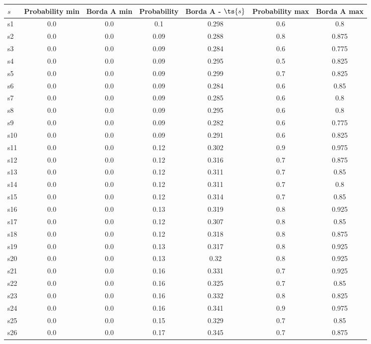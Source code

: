 \documentclass{article}
\begin{document}
\noindent\begin{tabular}{|l|c|c|c|c|c|c|}
\hline
$s$& Probability min & Borda A min & Probability & Borda A - $\ts{s}$ & Probability max & Borda A max\\
\hline
s1 &0.0 & 0.0 & 0.1 & 0.298 & 0.6 & 0.8\\
\hline
s2 &0.0 & 0.0 & 0.09 & 0.288 & 0.8 & 0.875\\
\hline
s3 &0.0 & 0.0 & 0.09 & 0.284 & 0.6 & 0.775\\
\hline
s4 &0.0 & 0.0 & 0.09 & 0.295 & 0.5 & 0.825\\
\hline
s5 &0.0 & 0.0 & 0.09 & 0.299 & 0.7 & 0.825\\
\hline
s6 &0.0 & 0.0 & 0.09 & 0.284 & 0.6 & 0.85\\
\hline
s7 &0.0 & 0.0 & 0.09 & 0.285 & 0.6 & 0.8\\
\hline
s8 &0.0 & 0.0 & 0.09 & 0.295 & 0.6 & 0.8\\
\hline
s9 &0.0 & 0.0 & 0.09 & 0.282 & 0.6 & 0.775\\
\hline
s10 &0.0 & 0.0 & 0.09 & 0.291 & 0.6 & 0.825\\
\hline
s11 &0.0 & 0.0 & 0.12 & 0.302 & 0.9 & 0.975\\
\hline
s12 &0.0 & 0.0 & 0.12 & 0.316 & 0.7 & 0.875\\
\hline
s13 &0.0 & 0.0 & 0.12 & 0.311 & 0.7 & 0.85\\
\hline
s14 &0.0 & 0.0 & 0.12 & 0.311 & 0.7 & 0.8\\
\hline
s15 &0.0 & 0.0 & 0.12 & 0.314 & 0.7 & 0.85\\
\hline
s16 &0.0 & 0.0 & 0.13 & 0.319 & 0.8 & 0.925\\
\hline
s17 &0.0 & 0.0 & 0.12 & 0.307 & 0.8 & 0.85\\
\hline
s18 &0.0 & 0.0 & 0.12 & 0.318 & 0.8 & 0.875\\
\hline
s19 &0.0 & 0.0 & 0.13 & 0.317 & 0.8 & 0.925\\
\hline
s20 &0.0 & 0.0 & 0.13 & 0.32 & 0.8 & 0.925\\
\hline
s21 &0.0 & 0.0 & 0.16 & 0.331 & 0.7 & 0.925\\
\hline
s22 &0.0 & 0.0 & 0.16 & 0.325 & 0.7 & 0.85\\
\hline
s23 &0.0 & 0.0 & 0.16 & 0.332 & 0.8 & 0.825\\
\hline
s24 &0.0 & 0.0 & 0.16 & 0.341 & 0.9 & 0.975\\
\hline
s25 &0.0 & 0.0 & 0.15 & 0.329 & 0.7 & 0.85\\
\hline
s26 &0.0 & 0.0 & 0.17 & 0.345 & 0.7 & 0.875\\

\end{tabular}
\end{document}
